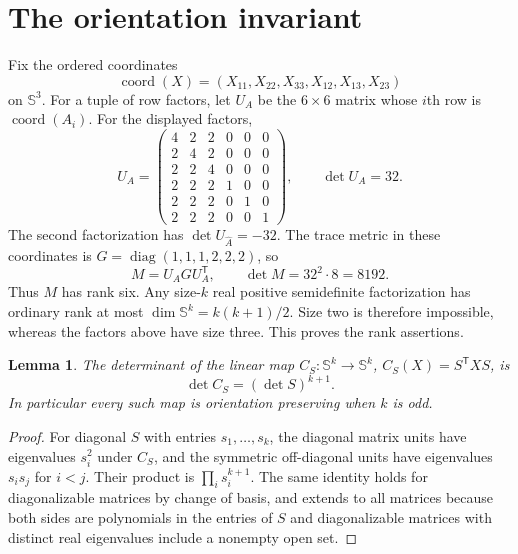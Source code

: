 \documentclass[11pt]{article}
\newtheorem{lemma}[theorem]{Lemma}
\begin{document}
\section{The orientation invariant}
Fix the ordered coordinates
\[
\operatorname{coord}(X)=(X_{11},X_{22},X_{33},X_{12},X_{13},X_{23})
\]
on $\mathbb S^3$. For a tuple of row factors, let $U_A$ be the $6\times6$ matrix whose $i$th row is $\operatorname{coord}(A_i)$. For the displayed factors,
\[
U_A=\begin{pmatrix}
4&2&2&0&0&0\\
2&4&2&0&0&0\\
2&2&4&0&0&0\\
2&2&2&1&0&0\\
2&2&2&0&1&0\\
2&2&2&0&0&1
\end{pmatrix},\qquad \det U_A=32.
\]
The second factorization has $\det U_{\widehat A}=-32$.
The trace metric in these coordinates is $G=\operatorname{diag}(1,1,1,2,2,2)$, so
\[
 M=U_A G U_A^{\mathsf T},\qquad \det M=32^2\cdot8=8192.
\]
Thus $M$ has rank six. Any size-$k$ real positive semidefinite factorization has ordinary rank at most $\dim\mathbb S^k=k(k+1)/2$. Size two is therefore impossible, whereas the factors above have size three. This proves the rank assertions.

\begin{lemma}\label{lem:det}
The determinant of the linear map $C_S:\mathbb S^k\to\mathbb S^k$, $C_S(X)=S^{\mathsf T}XS$, is
\[
 \det C_S=(\det S)^{k+1}.
\]
In particular every such map is orientation preserving when $k$ is odd.
\end{lemma}
\begin{proof}
For diagonal $S$ with entries $s_1,\ldots,s_k$, the diagonal matrix units have eigenvalues $s_i^2$ under $C_S$, and the symmetric off-diagonal units have eigenvalues $s_is_j$ for $i<j$. Their product is $\prod_i s_i^{k+1}$. The same identity holds for diagonalizable matrices by change of basis, and extends to all matrices because both sides are polynomials in the entries of $S$ and diagonalizable matrices with distinct real eigenvalues include a nonempty open set.
\end{proof}
\end{document}
